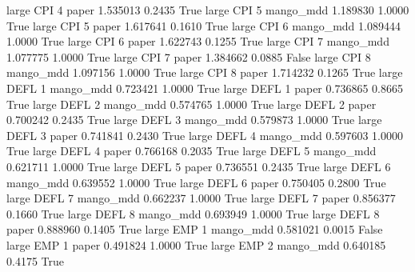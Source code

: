      large      CPI                 4                 paper      1.535013      0.2435    True
     large      CPI                 5             mango_mdd      1.189830      1.0000    True
     large      CPI                 5                 paper      1.617641      0.1610    True
     large      CPI                 6             mango_mdd      1.089444      1.0000    True
     large      CPI                 6                 paper      1.622743      0.1255    True
     large      CPI                 7             mango_mdd      1.077775      1.0000    True
     large      CPI                 7                 paper      1.384662      0.0885   False
     large      CPI                 8             mango_mdd      1.097156      1.0000    True
     large      CPI                 8                 paper      1.714232      0.1265    True
     large     DEFL                 1             mango_mdd      0.723421      1.0000    True
     large     DEFL                 1                 paper      0.736865      0.8665    True
     large     DEFL                 2             mango_mdd      0.574765      1.0000    True
     large     DEFL                 2                 paper      0.700242      0.2435    True
     large     DEFL                 3             mango_mdd      0.579873      1.0000    True
     large     DEFL                 3                 paper      0.741841      0.2430    True
     large     DEFL                 4             mango_mdd      0.597603      1.0000    True
     large     DEFL                 4                 paper      0.766168      0.2035    True
     large     DEFL                 5             mango_mdd      0.621711      1.0000    True
     large     DEFL                 5                 paper      0.736551      0.2435    True
     large     DEFL                 6             mango_mdd      0.639552      1.0000    True
     large     DEFL                 6                 paper      0.750405      0.2800    True
     large     DEFL                 7             mango_mdd      0.662237      1.0000    True
     large     DEFL                 7                 paper      0.856377      0.1660    True
     large     DEFL                 8             mango_mdd      0.693949      1.0000    True
     large     DEFL                 8                 paper      0.888960      0.1405    True
     large      EMP                 1             mango_mdd      0.581021      0.0015   False
     large      EMP                 1                 paper      0.491824      1.0000    True
     large      EMP                 2             mango_mdd      0.640185      0.4175    True
